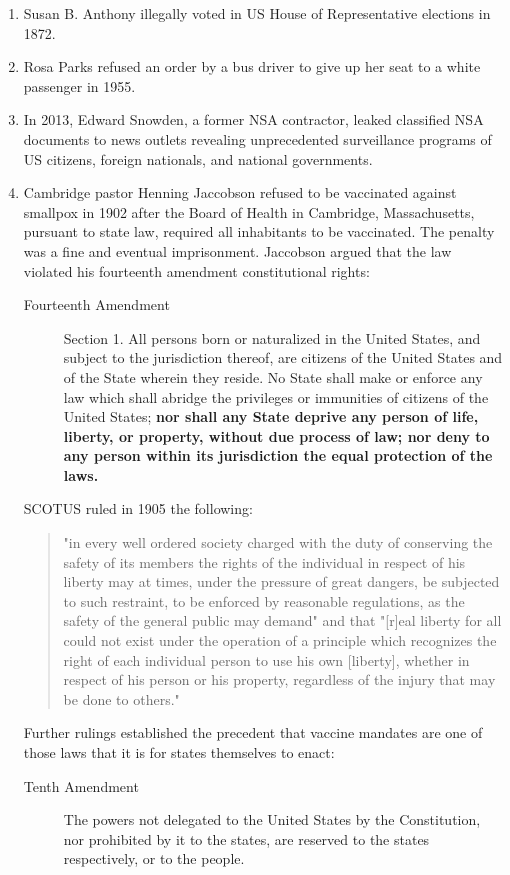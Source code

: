 \documentclass[oneside]{article}
\begin{document}
\begin{enumerate}
\item Susan B. Anthony illegally voted in US House of Representative elections in 1872. 
\item Rosa Parks refused an order by a bus driver to give up her seat to a white passenger in 1955.
\item   In 2013, Edward Snowden, a former NSA contractor, leaked classified NSA documents to news outlets revealing unprecedented surveillance programs of US citizens, foreign nationals, and national governments.
\item Cambridge pastor Henning Jaccobson refused to be vaccinated against smallpox in 1902 after the Board of Health in Cambridge, Massachusetts, pursuant to state law, required all inhabitants to be vaccinated. The penalty was a fine and eventual imprisonment. Jaccobson argued that the law violated his fourteenth amendment constitutional rights: 
\begin{description}
\item[Fourteenth Amendment]{Section 1. All persons born or naturalized in the United States, and subject to the jurisdiction thereof, are citizens of the United States and of the State wherein they reside. No State shall make or enforce any law which shall abridge the privileges or immunities of citizens of the United States; \textbf{nor shall any State deprive any person of life, liberty, or property, without due process of law; nor deny to any person within its jurisdiction the equal protection of the laws.}}
\end{description}
 SCOTUS ruled in 1905 the following: 
\begin{quote}
 "in every well ordered society charged with the duty of conserving the safety of its members the rights of the individual in respect of his liberty may at times, under the pressure of great dangers, be subjected to such restraint, to be enforced by reasonable regulations, as the safety of the general public may demand" and that "[r]eal liberty for all could not exist under the operation of a principle which recognizes the right of each individual person to use his own [liberty], whether in respect of his person or his property, regardless of the injury that may be done to others."
 \end{quote}
Further rulings established the precedent that vaccine mandates are one of those laws that it is for states themselves to enact: 
\begin{description}
\item[Tenth Amendment]{The powers not delegated to the United States by the Constitution, nor prohibited by it to the states, are reserved to the states respectively, or to the people.}
\end{description}
\end{enumerate}
\end{document}

